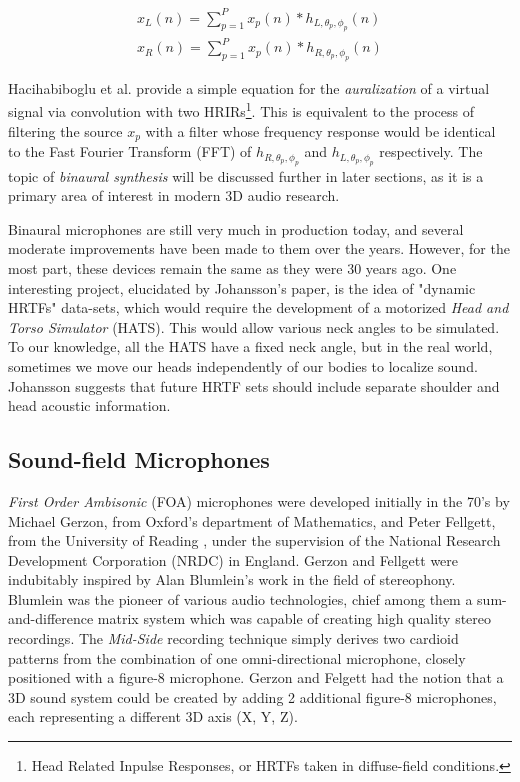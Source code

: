 \begin{equation} \label{eq:conv-hrir}
\begin{array}{l}
x_{L}(n)=\sum_{p=1}^{P} x_{p}(n) * h_{L, \theta_{p}, \phi_{p}}(n) \\
x_{R}(n)=\sum_{p=1}^{P} x_{p}(n) * h_{R, \theta_{p}, \phi_{p}}(n)
\end{array}
\end{equation}

Hacihabiboglu et al. \cite{hacihabiboglu2017perceptual} provide a simple equation for the \textit{auralization} of a virtual signal via convolution with two HRIRs\footnote{Head Related Inpulse Responses, or HRTFs taken in diffuse-field conditions.}. This is equivalent to the process of filtering the source $x_p$ with a filter whose frequency response would be identical to the Fast Fourier Transform (FFT) of $h_{R, \theta_{p}, \phi_{p}}$ and $h_{L, \theta_{p}, \phi_{p}}$ respectively. The topic of \textit{binaural synthesis} will be discussed further in later sections, as it is a primary area of interest in modern 3D audio research.

Binaural microphones are still very much in production today, and several moderate improvements have been made to them over the years. However, for the most part, these devices remain the same as they were 30 years ago. One interesting project, elucidated by Johansson's \cite{johansson2019vr} paper, is the idea of "dynamic HRTFs" data-sets, which would require the development of a motorized \textit{Head and Torso Simulator} (HATS). This would allow various neck angles to be simulated. To our knowledge, all the HATS have a fixed neck angle, but in the real world, sometimes we move our heads independently of our bodies to localize sound. Johansson suggests that future HRTF sets should include separate shoulder and head acoustic information.

\subsection{Sound-field Microphones}

\textit{First Order Ambisonic} (FOA) microphones were developed initially in the 70's by Michael Gerzon, from Oxford's department of Mathematics, and Peter Fellgett, from the University of Reading \cite{elen1991whatever}, under the supervision of the National Research Development Corporation (NRDC) in England. Gerzon and Fellgett were indubitably inspired by Alan Blumlein's work in the field of stereophony. Blumlein was the pioneer of various audio technologies, chief among them a sum-and-difference matrix system which was capable of creating high quality stereo recordings. The \textit{Mid-Side} recording technique simply derives two cardioid patterns from the combination of one omni-directional microphone, closely positioned with a figure-8 microphone. Gerzon and Felgett had the notion that a 3D sound system could be created by adding 2 additional figure-8 microphones, each representing a different 3D axis (X, Y, Z). 

